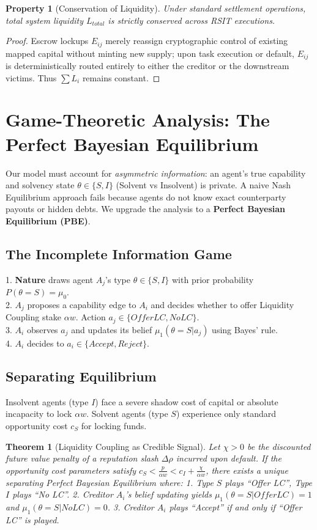 \documentclass[11pt]{article}
\newtheorem{theorem}{Theorem}[section]
\newtheorem{property}{Property}[section]
\begin{document}
\begin{property}[Conservation of Liquidity]
Under standard settlement operations, total system liquidity $L_{total}$ is strictly conserved across RSIT executions.
\end{property}
\begin{proof}
Escrow lockups $E_{ij}$ merely reassign cryptographic control of existing mapped capital without minting new supply; upon task execution or default, $E_{ij}$ is deterministically routed entirely to either the creditor or the downstream victims. Thus $\sum L_i$ remains constant.
\end{proof}

\section{Game-Theoretic Analysis: The Perfect Bayesian Equilibrium}
Our model must account for \textit{asymmetric information}: an agent's true capability and solvency state $\theta \in \{S, I\}$ (Solvent vs Insolvent) is private. A naive Nash Equilibrium approach fails because agents do not know exact counterparty payouts or hidden debts. We upgrade the analysis to a \textbf{Perfect Bayesian Equilibrium (PBE)}.

\subsection{The Incomplete Information Game}
1. \textbf{Nature} draws agent $A_j$'s type $\theta \in \{S, I\}$ with prior probability $P(\theta=S) = \mu_0$. \\
2. $A_j$ proposes a capability edge to $A_i$ and decides whether to offer Liquidity Coupling stake $\alpha w$. Action $a_j \in \{Offer LC, No LC\}$. \\
3. $A_i$ observes $a_j$ and updates its belief $\mu_1(\theta=S | a_j)$ using Bayes' rule. \\
4. $A_i$ decides to $a_i \in \{Accept, Reject\}$.

\subsection{Separating Equilibrium}
Insolvent agents (type $I$) face a severe shadow cost of capital or absolute incapacity to lock $\alpha w$. Solvent agents (type $S$) experience only standard opportunity cost $c_S$ for locking funds.

\begin{theorem}[Liquidity Coupling as Credible Signal]
\label{thm:signaling}
Let $\chi > 0$ be the discounted future value penalty of a reputation slash $\Delta\rho$ incurred upon default. If the opportunity cost parameters satisfy $c_S < \frac{p}{\alpha w} < c_I + \frac{\chi}{\alpha w}$, there exists a unique separating Perfect Bayesian Equilibrium where:
1. Type $S$ plays ``Offer LC'', Type $I$ plays ``No LC''.
2. Creditor $A_i$'s belief updating yields $\mu_1(\theta=S | Offer LC) = 1$ and $\mu_1(\theta=S | No LC) = 0$.
3. Creditor $A_i$ plays ``Accept'' if and only if ``Offer LC'' is played.
\end{theorem}
\end{document}
